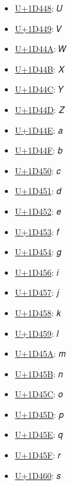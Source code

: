 \begin{itemize}
	\item \href{https://www.compart.com/en/unicode/U+1D448}{U+1D448}: 𝑈
	\item \href{https://www.compart.com/en/unicode/U+1D449}{U+1D449}: 𝑉
	\item \href{https://www.compart.com/en/unicode/U+1D44A}{U+1D44A}: 𝑊
	\item \href{https://www.compart.com/en/unicode/U+1D44B}{U+1D44B}: 𝑋
	\item \href{https://www.compart.com/en/unicode/U+1D44C}{U+1D44C}: 𝑌
	\item \href{https://www.compart.com/en/unicode/U+1D44D}{U+1D44D}: 𝑍
	\item \href{https://www.compart.com/en/unicode/U+1D44E}{U+1D44E}: 𝑎
	\item \href{https://www.compart.com/en/unicode/U+1D44F}{U+1D44F}: 𝑏
	\item \href{https://www.compart.com/en/unicode/U+1D450}{U+1D450}: 𝑐
	\item \href{https://www.compart.com/en/unicode/U+1D451}{U+1D451}: 𝑑
	\item \href{https://www.compart.com/en/unicode/U+1D452}{U+1D452}: 𝑒
	\item \href{https://www.compart.com/en/unicode/U+1D453}{U+1D453}: 𝑓
	\item \href{https://www.compart.com/en/unicode/U+1D454}{U+1D454}: 𝑔
	\item \href{https://www.compart.com/en/unicode/U+1D456}{U+1D456}: 𝑖
	\item \href{https://www.compart.com/en/unicode/U+1D457}{U+1D457}: 𝑗
	\item \href{https://www.compart.com/en/unicode/U+1D458}{U+1D458}: 𝑘
	\item \href{https://www.compart.com/en/unicode/U+1D459}{U+1D459}: 𝑙
	\item \href{https://www.compart.com/en/unicode/U+1D45A}{U+1D45A}: 𝑚
	\item \href{https://www.compart.com/en/unicode/U+1D45B}{U+1D45B}: 𝑛
	\item \href{https://www.compart.com/en/unicode/U+1D45C}{U+1D45C}: 𝑜
	\item \href{https://www.compart.com/en/unicode/U+1D45D}{U+1D45D}: 𝑝
	\item \href{https://www.compart.com/en/unicode/U+1D45E}{U+1D45E}: 𝑞
	\item \href{https://www.compart.com/en/unicode/U+1D45F}{U+1D45F}: 𝑟
	\item \href{https://www.compart.com/en/unicode/U+1D460}{U+1D460}: 𝑠

\end{itemize}
